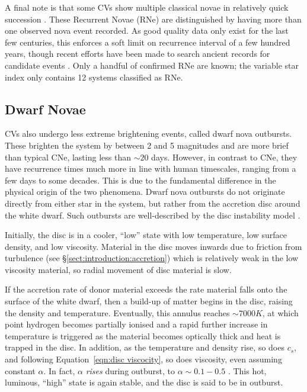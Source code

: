 A final note is that some CVs show multiple classical novae in relatively quick succession \citep{schaeffer2010}. These Recurrent Novae (RNe) are distinguished by having more than one observed nova event recorded. As good quality data only exist for the last few centuries, this enforces a soft limit on recurrence interval of a few hundred years, though recent efforts have been made to search ancient records for candidate events \citep{hoffmann2022}. Only a handful of confirmed RNe are known; the variable star index \citep{Watson2006} only contains 12 systems classified as RNe.

\subsection{Dwarf Novae}
\label{sect:introduction:dwarf novae}

CVs also undergo less extreme brightening events, called dwarf nova outbursts. These brighten the system by between 2 and 5 magnitudes \citep{warner1995} and are more brief than typical CNe, lasting less than $\sim 20$ days. However, in contrast to CNe, they have recurrence times much more in line with human timescales, ranging from a few days to some decades. This is due to the fundamental difference in the physical origin of the two phenomena.
Dwarf nova outbursts do not originate directly from either star in the system, but rather from the accretion disc around the white dwarf. Such outbursts are well-described by the disc instability model \citep{cannizzo1993, dubus2018}.

Initially, the disc is in a cooler, ``low'' state with low temperature, low surface density, and low viscosity. Material in the disc moves inwards due to friction from turbulence (see \S\ref{sect:introduction:accretion}) which is relatively weak in the low viscosity material, so radial movement of disc material is slow.

If the accretion rate of donor material exceeds the rate material falls onto the surface of the white dwarf, then a build-up of matter begins in the disc, raising the density and temperature. Eventually, this annulus reaches $\sim 7000K$, at which point hydrogen becomes partially ionised and a rapid further increase in temperature is triggered as the material becomes optically thick and heat is trapped in the disc. In addition, as the temperature and density rise, so does $c_s$, and following Equation~\ref{eqn:disc viscocity}, so does viscosity, even assuming constant $\alpha$. In fact, $\alpha$ {\it rises} during outburst, to $\alpha \sim 0.1 - 0.5$ \citep{hellier2001}. This hot, luminous, ``high'' state is again stable, and the disc is said to be in outburst.

